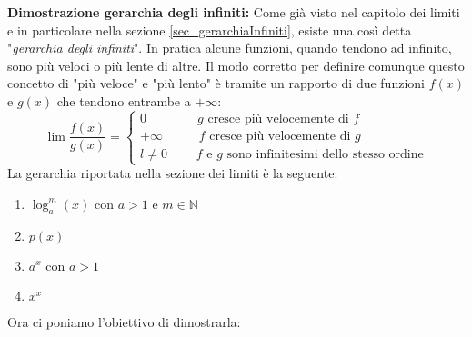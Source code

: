 \label{dim_gerarchiaInfiniti}
\textbf{Dimostrazione gerarchia degli infiniti:} Come già visto nel capitolo dei limiti e in particolare nella sezione \ref{sec_gerarchiaInfiniti}, esiste una così detta "\textit{gerarchia degli infiniti}". In pratica alcune funzioni, quando tendono ad infinito, sono più veloci o più lente di altre. Il modo corretto per definire comunque questo concetto di "più veloce" e "più lento" è tramite un rapporto di due funzioni $f(x)$ e $g(x)$ che tendono entrambe a $+ \infty$:
\begin{equation*}
    \lim \dfrac{f(x)}{g(x)} =
    \begin{cases*}
        0 \qquad \qquad g \text{ cresce più velocemente di } f\\
        +\infty \qquad \;\;\; f \text{ cresce più velocemente di } g\\
        l \neq 0 \qquad \; \text{$f$ e $g$ sono infinitesimi dello stesso ordine}
    \end{cases*}
\end{equation*}
La gerarchia riportata nella sezione dei limiti è la seguente:
\begin{enumerate}
	\item $\log_a^m (x)$ con $a > 1$ e $m \in \mathbb{N}$
	\item $p(x)$
	\item $a^x$ con $a > 1$
	\item $x^x$
\end{enumerate}
Ora ci poniamo l'obiettivo di dimostrarla:
